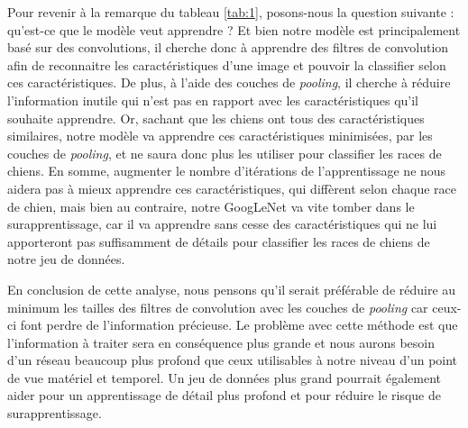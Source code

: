 \documentclass{article}
\begin{document}
Pour revenir à la remarque du tableau \ref{tab:1}, posons-nous la question
suivante : qu’est-ce que le modèle veut apprendre ? Et bien notre modèle est
principalement basé sur des convolutions, il cherche donc à apprendre des
filtres de convolution afin de reconnaitre les caractéristiques d’une image et
pouvoir la classifier selon ces caractéristiques. De plus, à l’aide des
couches de \textit{pooling}, il cherche à réduire l’information inutile qui
n’est pas en rapport avec les caractéristiques qu’il souhaite apprendre. Or,
sachant que les chiens ont tous des caractéristiques similaires, notre modèle va
apprendre ces caractéristiques minimisées, par les couches de \textit{pooling},
et ne saura donc plus les utiliser pour classifier les races de chiens. En
somme, augmenter le nombre d’itérations de l’apprentissage ne nous aidera pas à
mieux apprendre ces caractéristiques, qui diffèrent selon chaque race de chien,
mais bien au contraire, notre GoogLeNet va vite tomber dans le surapprentissage,
car il va apprendre sans cesse des caractéristiques qui ne lui apporteront pas
suffisamment de détails pour classifier les races de chiens de notre jeu de
données. 

En conclusion de cette analyse, nous pensons qu’il serait préférable de réduire
au minimum les tailles des filtres de convolution avec les couches de
\textit{pooling} car ceux-ci font perdre de l’information précieuse. Le problème
avec cette méthode est que l’information à traiter sera en conséquence plus
grande et nous aurons besoin d’un réseau beaucoup plus profond que ceux
utilisables à notre niveau d’un point de vue matériel et temporel. Un jeu de
données plus grand pourrait également aider pour un apprentissage
de détail plus profond et pour réduire le risque de surapprentissage.



\end{document}
